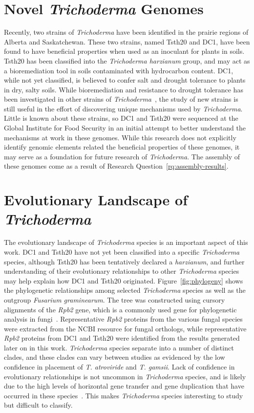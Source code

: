 \section{Novel \textit{Trichoderma} Genomes}
\label{lit:novel-genomes}
Recently, two strains of \textit{Trichoderma}
have been identified in the prairie regions of Alberta and
Saskatchewan. These two strains, named Tsth20 and DC1, have been found
to have beneficial properties when used as an inoculant for plants in soils. Tsth20 has been classified into the \textit{Trichoderma harzianum} group, and may act as a bioremediation tool in soils contaminated with hydrocarbon content. DC1, while not yet classified, is believed to confer salt and drought tolerance to plants in dry, salty soils. While bioremediation and resistance to drought tolerance has been investigated in other strains of
\textit{Trichoderma}~\cite{senizza2023}, the study of new strains is still useful in the effort of discovering unique mechanisms used by \textit{Trichoderma}. Little is known about these strains, so DC1 and Tsth20 were sequenced at the Global Institute for Food Security in an initial attempt to better understand the mechanisms at work in these genomes. While this research does not explicitly identify genomic elements related the beneficial properties of these genomes, it may serve as a foundation for future research of \textit{Trichoderma}. The assembly of these genomes come as a result of Research Question~\ref{rq:assembly-results}.

\section{Evolutionary Landscape of \textit{Trichoderma}}
\label{lit:evolution}

The evolutionary landscape of \textit{Trichoderma} species is an important aspect of this work. DC1 and Tsth20 have not yet been classified into a specific \textit{Trichoderma} species, although Tsth20 has been tentatively declared a \textit{harzianum}, and further understanding of their evolutionary relationships to other \textit{Trichoderma} species may help explain how DC1 and Tsth20 originated. 
Figure~\ref{fig:phylogeny} shows the phylogenetic relationships among selected \textit{Trichoderma} species as well as the outgroup \textit{Fusarium graminearum}. The tree was constructed using cursory alignments of the \textit{Rpb2} gene, which is a commonly used gene for phylogenetic analysis in fungi~\cite{an2022}. Representative \textit{Rpb2} proteins from the various fungal species were extracted from the NCBI resource for fungal orthologs, while representative \textit{Rpb2} proteins from DC1 and Tsth20 were identified from the results generated later on in this work. \textit{Trichoderma} species separate into a number of distinct clades, and these clades can vary between studies as evidenced by the low confidence in placement of \textit{T. atroviride} and \textit{T. gamsii}. Lack of confidence in evolutionary relationships is not uncommon in \textit{Trichoderma} species, and is likely due to the high levels of horizontal gene transfer and gene duplication that have occurred in these species~\cite{goncalves2024}. This makes \textit{Trichoderma} species interesting to study but difficult to classify. 

